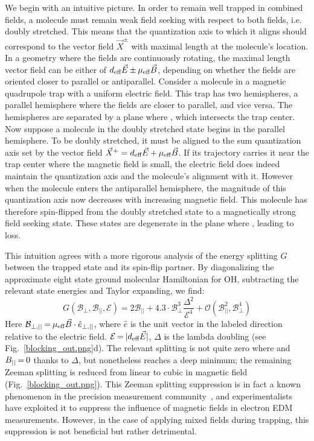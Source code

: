 We begin with an intuitive picture.
In order to remain well trapped in combined fields, a molecule must remain weak field seeking with respect to both fields, i.e. doubly stretched.
This means that the quantization axis to which it aligns should correspond to the vector field $\vec{X}^{\pm}$ with maximal length at the molecule's location.
In a geometry where the fields are continuously rotating, the maximal length vector field can be either of $d_\text{eff}\vec{E} {\nobreak\hspace{.2em}} {\pm}{\nobreak\hspace{.2em}}  \mu_\text{eff}\vec{B}$, depending on whether the fields are oriented closer to parallel or antiparallel.
Consider a molecule in a magnetic quadrupole trap with a uniform electric field.
This trap has two hemispheres, a parallel hemisphere where the fields are closer to parallel, and vice versa.
The hemispheres are separated by a plane where \epb{}, which intersects the trap center.
Now suppose a molecule in the doubly stretched state begins in the parallel hemisphere.
To be doubly stretched, it must be aligned to the sum quantization axis set by the vector field $\vec{X}^{+} = d_\text{eff}\vec{E} {\nobreak\hspace{.2em}} {+}{\nobreak\hspace{.2em}}  \mu_\text{eff}\vec{B}$.
If its trajectory carries it near the trap center where the magnetic field is small, the electric field does indeed maintain the quantization axis and the molecule's alignment with it.
However when the molecule enters the antiparallel hemisphere, the magnitude of this quantization axis now decreases with increasing magnetic field. This molecule has therefore spin-flipped from the doubly stretched state to a magnetically strong field seeking state. These states are degenerate in the plane where \epb{}, leading to loss.

This intuition agrees with a more rigorous analysis of the energy splitting $G$ between the trapped state and its spin-flip partner.
By diagonalizing the approximate eight state ground molecular Hamiltonian for OH, subtracting the relevant state energies and Taylor expanding, we find:
\begin{equation}
\label{eqn:energetics}
G(\mathcal{B}_\perp,\mathcal{B}_{||},\mathcal{E}) = 2\mathcal{B}_{||} + 4.3\!\cdot\!\mathcal{B}_\perp^3\frac{\Delta^2}{\mathcal{E}^4} + \mathcal{O}(\mathcal{B}_{||}^2,\mathcal{B}_\perp^4)
\end{equation}
Here $\mathcal{B}_{\perp,||}{\nobreak\hspace{.2em}} {=}{\nobreak\hspace{.2em}}\mu_\text{eff}\vec{B}\cdot\hat{e}_{\perp,||}$, where $\hat{e}$ is the unit vector in the labeled direction relative to the electric field.
$\mathcal{E}{\nobreak\hspace{.2em}} {=}{\nobreak\hspace{.2em}} |d_\text{eff}\vec{E}|$, $\Delta$ is the lambda doubling (see Fig.~\ref{blocking_out.png}d).
The relevant splitting is not quite zero where \epb{} and $B_{||}{\nobreak\hspace{.2em}} {=}{\nobreak\hspace{.2em}} 0$ thanks to $\Delta$, but nonetheless reaches a deep minimum; the remaining Zeeman splitting is reduced from linear to cubic in magnetic field (Fig.~\ref{blocking_out.png}).
This Zeeman splitting suppression is in fact a known phenomenon in the precision measurement community~\cite{Player1970,Hudson2002},
and experimentalists have exploited it to suppress the influence of magnetic fields in electron EDM measurements.
However, in the case of applying mixed fields during trapping, this suppression is not beneficial but rather detrimental.


